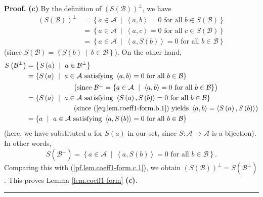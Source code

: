 \documentclass[numbers=enddot,12pt,final,onecolumn,notitlepage]{scrartcl}%
\numberwithin{exer}{subsection}
\theoremstyle{definition}
\newenvironment{proof}[1][Proof]{\noindent\textbf{#1.} }{\ \rule{0.5em}{0.5em}}
\begin{document}
\begin{proof}
\textbf{(c)} By the definition of $\left(  S\left(  \mathcal{B}\right)
\right)  ^{\perp}$, we have%
\begin{align}
\left(  S\left(  \mathcal{B}\right)  \right)  ^{\perp}  &  =\left\{
a\in\mathcal{A}\ \mid\ \left\langle a,b\right\rangle =0\text{ for all }b\in
S\left(  \mathcal{B}\right)  \right\} \nonumber\\
&  =\left\{  a\in\mathcal{A}\ \mid\ \left\langle a,c\right\rangle =0\text{ for
all }c\in S\left(  \mathcal{B}\right)  \right\} \nonumber\\
&  =\left\{  a\in\mathcal{A}\ \mid\ \left\langle a,S\left(  b\right)
\right\rangle =0\text{ for all }b\in\mathcal{B}\right\}
\label{pf.lem.coeff1-form.c.1}%
\end{align}
(since $S\left(  \mathcal{B}\right)  =\left\{  S\left(  b\right)  \ \mid
\ b\in\mathcal{B}\right\}  $). On the other hand,%
\begin{align*}
S\left(  \mathcal{B}^{\perp}\right)   &  =\left\{  S\left(  a\right)
\ \mid\ a\in\mathcal{B}^{\perp}\right\} \\
&  =\left\{  S\left(  a\right)  \ \mid\ a\in\mathcal{A}\text{ satisfying
}\left\langle a,b\right\rangle =0\text{ for all }b\in\mathcal{B}\right\} \\
&  \ \ \ \ \ \ \ \ \ \ \ \ \ \ \ \ \ \ \ \ \left(  \text{since }%
\mathcal{B}^{\perp}=\left\{  a\in\mathcal{A}\ \mid\ \left\langle
a,b\right\rangle =0\text{ for all }b\in\mathcal{B}\right\}  \right) \\
&  =\left\{  S\left(  a\right)  \ \mid\ a\in\mathcal{A}\text{ satisfying
}\left\langle S\left(  a\right)  ,S\left(  b\right)  \right\rangle =0\text{
for all }b\in\mathcal{B}\right\} \\
&  \ \ \ \ \ \ \ \ \ \ \ \ \ \ \ \ \ \ \ \ \left(  \text{since
(\ref{eq.lem.coeff1-form.b.1}) yields }\left\langle a,b\right\rangle
=\left\langle S\left(  a\right)  ,S\left(  b\right)  \right\rangle \right) \\
&  =\left\{  a\ \mid\ a\in\mathcal{A}\text{ satisfying }\left\langle
a,S\left(  b\right)  \right\rangle =0\text{ for all }b\in\mathcal{B}\right\}
\end{align*}
(here, we have substituted $a$ for $S\left(  a\right)  $ in our set, since
$S:\mathcal{A}\rightarrow\mathcal{A}$ is a bijection). In other words,%
\[
S\left(  \mathcal{B}^{\perp}\right)  =\left\{  a\in\mathcal{A}\ \mid
\ \left\langle a,S\left(  b\right)  \right\rangle =0\text{ for all }%
b\in\mathcal{B}\right\}  .
\]
Comparing this with (\ref{pf.lem.coeff1-form.c.1}), we obtain $\left(
S\left(  \mathcal{B}\right)  \right)  ^{\perp}=S\left(  \mathcal{B}^{\perp
}\right)  $. This proves Lemma \ref{lem.coeff1-form} \textbf{(c)}.
\end{proof}
\end{document}
